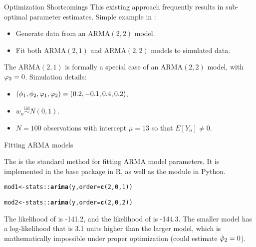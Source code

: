 \documentclass[aspectratio=169]{beamer}\usepackage[]{graphicx}\usepackage[]{xcolor}
\makeatletter
\newcommand{\hlnum}[1]{\textcolor[rgb]{0.686,0.059,0.569}{#1}}%
\newcommand{\hlopt}[1]{\textcolor[rgb]{0,0,0}{#1}}%
\newcommand{\hldef}[1]{\textcolor[rgb]{0.345,0.345,0.345}{#1}}%
\newcommand{\hlkwb}[1]{\textcolor[rgb]{0.69,0.353,0.396}{#1}}%
\newcommand{\hlkwc}[1]{\textcolor[rgb]{0.333,0.667,0.333}{#1}}%
\newcommand{\hlkwd}[1]{\textcolor[rgb]{0.737,0.353,0.396}{\textbf{#1}}}%
\newenvironment{kframe}{%
 \def\at@end@of@kframe{}%
 \ifinner\ifhmode%
  \def\at@end@of@kframe{\end{minipage}}%
  \begin{minipage}{\columnwidth}%
 \fi\fi%
 \def\FrameCommand##1{\hskip\@totalleftmargin \hskip-\fboxsep
 \colorbox{shadecolor}{##1}\hskip-\fboxsep
     \hskip-\linewidth \hskip-\@totalleftmargin \hskip\columnwidth}%
 \MakeFramed {\advance\hsize-\width
   \@totalleftmargin\z@ \linewidth\hsize
   \@setminipage}}%
 {\par\unskip\endMakeFramed%
 \at@end@of@kframe}
\newenvironment{knitrout}{}{} %
\makeatother
\begin{document}
\begin{frame}{Optimization Shortcomings}
This existing approach frequently results in sub-optimal parameter estimates. Simple example in : 
\begin{itemize}
  \item Generate data from an $\mathrm{ARMA}(2, 2)$ model.
  \item Fit both $\mathrm{ARMA}(2, 1)$ and $\mathrm{ARMA}(2, 2)$ models to simulated data.
\end{itemize}
The $\mathrm{ARMA}(2, 1)$ is formally a special case of an $\mathrm{ARMA}(2, 2)$ model, with $\varphi_2 = 0$. \pause
Simulation details: 
\begin{itemize}
  \item $(\phi_1, \phi_2, \varphi_1, \varphi_2) = (0.2, -0.1, 0.4, 0.2)$.
  \item $w_n \overset{\text{iid}}{\sim} N(0, 1)$. 
  \item $N = 100$ observations with intercept $\mu = 13$ so that $E[Y_n] \neq 0$.
\end{itemize}



\end{frame}

\begin{frame}{Fitting ARMA models}

The \citet{gardner1980} is the standard method for fitting ARMA model parameters. It is implemented in the base  package in R, as well as the  module in Python.

\begin{knitrout}
\color{fgcolor}\begin{kframe}
\begin{alltt}
\hldef{mod1} \hlkwb{<-} \hldef{stats}\hlopt{::}\hlkwd{arima}\hldef{(y,} \hlkwc{order} \hldef{=} \hlkwd{c}\hldef{(}\hlnum{2}\hldef{,} \hlnum{0}\hldef{,} \hlnum{1}\hldef{))}

\hldef{mod2} \hlkwb{<-} \hldef{stats}\hlopt{::}\hlkwd{arima}\hldef{(y,} \hlkwc{order} \hldef{=} \hlkwd{c}\hldef{(}\hlnum{2}\hldef{,} \hlnum{0}\hldef{,} \hlnum{2}\hldef{))}
\end{alltt}
\end{kframe}
\end{knitrout}

\pause 
The likelihood of  is -141.2, and the likelihood of  is -144.3. The \alert{smaller} model has a log-likelihood that is 3.1 units \alert{higher} than the larger model, which is mathematically impossible under proper optimization (could estimate $\hat{\varphi}_2 = 0$).
\end{frame}
\end{document}
